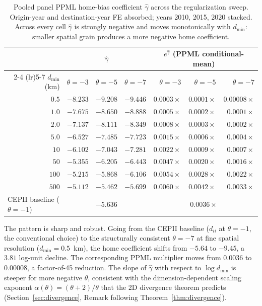 \documentclass[11pt, letterpaper]{article}
\theoremstyle{definition}
\newcommand{\dii}{d_{ii}}
\begin{document}
\begin{table}[h]
\centering
\small
\caption{Pooled panel PPML home-bias coefficient $\hat{\gamma}$ across
the regularization sweep. Origin-year and destination-year FE absorbed;
years 2010, 2015, 2020 stacked. Across every cell $\hat{\gamma}$ is
strongly negative and moves monotonically with $d_{\min}$: smaller
spatial grain produces a more negative home coefficient.
\label{tab:panel-sweep}}
\begin{tabular}{r r r r r r r}
\toprule
& \multicolumn{3}{c}{$\hat{\gamma}$} & \multicolumn{3}{c}{$e^{\hat{\gamma}}$ (PPML conditional-mean)} \\
\cmidrule(lr){2-4} \cmidrule(lr){5-7}
$d_{\min}$ (km) & $\theta = -3$ & $\theta = -5$ & $\theta = -7$ & $\theta = -3$ & $\theta = -5$ & $\theta = -7$ \\
\midrule
$0.5$ & $-8.233$ & $-9.208$ & $-9.446$ & $0.0003\times$ & $0.0001\times$ & $0.00008\times$ \\
$1.0$ & $-7.675$ & $-8.650$ & $-8.888$ & $0.0005\times$ & $0.0002\times$ & $0.0001\times$ \\
$2.0$ & $-7.137$ & $-8.111$ & $-8.349$ & $0.0008\times$ & $0.0003\times$ & $0.0002\times$ \\
$5.0$ & $-6.527$ & $-7.485$ & $-7.723$ & $0.0015\times$ & $0.0006\times$ & $0.0004\times$ \\
$10$  & $-6.102$ & $-7.043$ & $-7.281$ & $0.0022\times$ & $0.0009\times$ & $0.0007\times$ \\
$50$  & $-5.355$ & $-6.205$ & $-6.443$ & $0.0047\times$ & $0.0020\times$ & $0.0016\times$ \\
$100$ & $-5.215$ & $-5.868$ & $-6.106$ & $0.0054\times$ & $0.0028\times$ & $0.0022\times$ \\
$500$ & $-5.112$ & $-5.462$ & $-5.699$ & $0.0060\times$ & $0.0042\times$ & $0.0033\times$ \\
\midrule
\multicolumn{1}{l}{CEPII baseline ($\theta = -1$)}
& \multicolumn{3}{c}{$-5.636$}
& \multicolumn{3}{c}{$0.0036\times$} \\
\bottomrule
\end{tabular}
\end{table}

The pattern is sharp and robust. Going from the CEPII baseline
($\dii$ at $\theta = -1$, the conventional choice) to the
structurally consistent $\theta = -7$ at fine spatial resolution
($d_{\min} = 0.5$~km), the home coefficient shifts from $-5.64$ to
$-9.45$, a $3.81$ log-unit decline. The corresponding PPML
multiplier moves from $0.0036$ to $0.00008$, a factor-of-45 reduction.
The slope of $\hat{\gamma}$ with respect to $\log d_{\min}$ is steeper
for more negative $\theta$, consistent with the dimension-dependent
scaling exponent $\alpha(\theta) = (\theta + 2)/\theta$ that the 2D
divergence theorem predicts (Section~\ref{sec:divergence},
Remark following Theorem~\ref{thm:divergence}).
\end{document}
